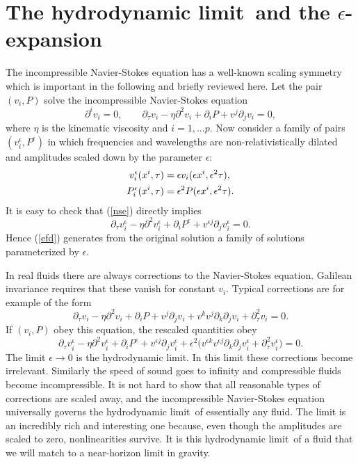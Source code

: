 \documentclass{article}
\def\beq{\begin{equation}}
\def\eeq{\end{equation}}
\def\p{\partial}
\def\e{{\epsilon}}
\def\hydrolimit{hydrodynamic limit}
\begin{document}
\section{The \hydrolimit~and the $\e$-expansion}
The incompressible Navier-Stokes equation has a well-known scaling symmetry which is important in the following and briefly reviewed here. Let the pair $(v_i,P)$ solve the incompressible Navier-Stokes equation
%
\beq\label{nse}
\p^i v_i=0,\qquad
\p_\tau v_i-\eta \p^2v_i+\p_iP+v^j\p_j v_i =0,
\eeq
%
where $\eta$ is the kinematic viscosity and $i=1,...p$. Now consider a family of pairs $(v^\e_i,P^\e)$ in which frequencies and wavelengths  are non-relativistically dilated
and amplitudes scaled down by the parameter $\e$:
%
\begin{align}\label{efd}
v^\e_i(x^i,\tau)&=\e v_i(\e x^i,\e^2 \tau),\\
P^\e_i(x^i,\tau)&=\e^2P (\e x^i,\e^2 \tau). \notag
\end{align}
%
It is easy to check that (\ref{nse}) directly implies
%
\beq
\p_\tau v^\e_i-\eta \p^2v^\e_i+\p_iP^\e+v^{\e j}\p_j v^\e_i %
=0.
\eeq
%
Hence (\ref{efd}) generates from the original solution  a family of solutions parameterized by
$\e$.

In real fluids there are always corrections to the Navier-Stokes equation. Galilean invariance requires that these vanish for constant $v_i$.  Typical corrections are for example of the form
%
\beq
\p_\tau v_i-\eta \p^2v_i+\p_iP+v^j\p_j v_i +v^kv^j\p_k\p_jv_i +\p_\tau^2v_i =0.
\eeq
%
If $(v_i,P)$ obey this equation, the rescaled quantities obey
%
\beq
 \p_\tau v^\e_i-\eta \p^2v^\e_i+\p_iP^\e+v^{\e j}\p_j v^\e_i %
+\e^2\bigl(v^{\e k}v^{\e j}\p_k\p_jv^\e_i +\p_\tau^2v^\e_i) =0.
\eeq
%
 The limit $\e \to 0$ is the \hydrolimit. In this limit these corrections become irrelevant. Similarly the speed of sound goes to infinity and compressible fluids become incompressible. It is not hard to show that all reasonable types of corrections are scaled away,
and the incompressible Navier-Stokes equation universally governs the \hydrolimit~of essentially any fluid. The limit is an incredibly rich and interesting one because, even though the amplitudes are scaled to zero,  nonlinearities survive. It is this \hydrolimit~of a fluid that we will match to a near-horizon limit in gravity.
%
%
%
\end{document}
